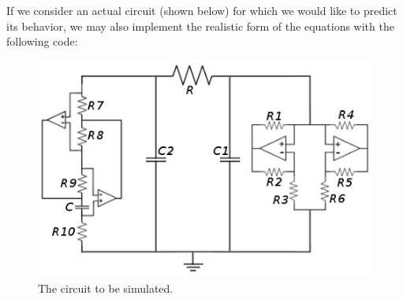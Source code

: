 \documentclass{article}
\begin{document}
    If we consider an actual circuit (shown below) for which we would like to predict its behavior, we may also implement the realistic form of the equations with the following code:
    
    \begin{figure}[h!]
        \centering
        \includegraphics[scale = 0.5]{Images/simulated_circuit.png}
        \caption{The circuit to be simulated.}
        \label{fig:my_label}
    \end{figure}
    
\end{document}
